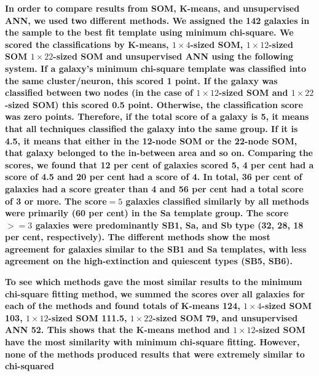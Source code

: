      
     
        \textbf{In order to compare results from SOM, K-means, and unsupervised ANN, we used two different methods.
        We assigned the 142 galaxies in the sample to the best fit  template using minimum chi-square.
        We scored the classifications by K-means, $1\times4$-sized SOM, $1\times12$-sized SOM $1\times22$-sized SOM and unsupervised ANN using the following system.
        If a galaxy's minimum chi-square template was classified into the same cluster/neuron, this scored 1 point. 
        If the galaxy was classified between two nodes (in the case of $1\times12$-sized SOM and $1\times22$-sized SOM) this scored 0.5 point. 
        Otherwise, the classification score was zero points. 
        Therefore, if the total score of a galaxy is 5, it means that all techniques classified the galaxy into the same group.
        If it is 4.5, it means that either in the 12-node SOM  or the 22-node SOM, that galaxy belonged to the in-between area and so on.
        Comparing the scores, we found that 12 per cent of galaxies scored 5, 4 per cent had a score of 4.5 and 20 per cent had a score of 4.
        In total, 36 per cent of galaxies had a score greater than 4 and 56 per cent had a total score of 3 or more.
        The score$=5$ galaxies classified similarly by all methods were primarily (60 per cent) in the Sa template group. %
        The score $>=3$ galaxies were predominantly SB1, Sa, and Sb type (32, 28, 18 per cent, respectively).
        The different methods show the most agreement for galaxies similar to the SB1 and Sa templates, with less agreement on the high-extinction and quiescent types (SB5, SB6).
        }
        
        \textbf{To see which methods gave the most similar results to the minimum chi-square fitting method, we summed the scores over all galaxies for each of the methods and found totals of K-means 124, $1\times4$-sized SOM 103, $1\times12$-sized SOM 111.5, $1\times22$-sized SOM 79, and unsupervised ANN 52.
        This shows that the K-means method and $1\times12$-sized SOM have the most similarity with minimum chi-square fitting.
        However, none of the methods produced results that were extremely similar to chi-squared
        }
        
